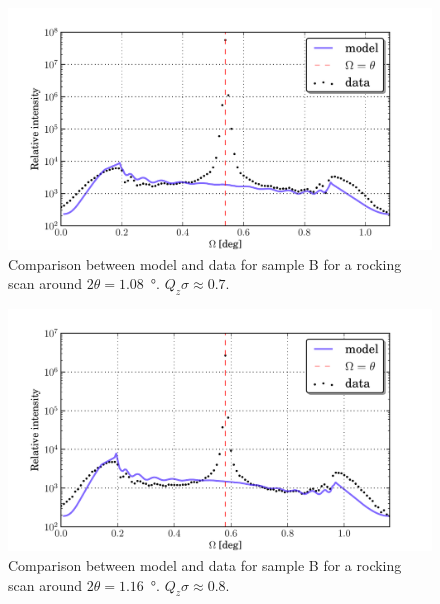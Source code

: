 \documentclass[10pt,twoside, b5paper,pdftex]{report}
\begin{document}
\begin{figure}[htbp]
	\begin{center}
		\includegraphics[width=1.0\textwidth]{figures/74_just_00341.pdf}
	\end{center}
	\caption{Comparison between model and data for sample B for a rocking scan around $2\theta = 1.08$~\si{\degree}. $Q_z\sigma \approx 0.7$.\label{fig:just_00341}}
\end{figure}
\begin{figure}[htbp]
	\begin{center}
		\includegraphics[width=1.0\textwidth]{figures/74_just_00342.pdf}
	\end{center}
	\caption{Comparison between model and data for sample B for a rocking scan around $2\theta = 1.16$~\si{\degree}. $Q_z\sigma \approx 0.8$. \label{fig:just_00342}}
\end{figure}
\end{document}
